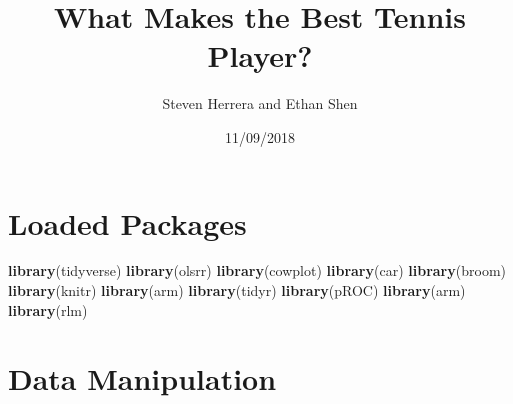 \documentclass[]{article}
\title{What Makes the Best Tennis Player?}
\author{Steven Herrera and Ethan Shen}
\date{11/09/2018}
\newenvironment{Shaded}{\begin{snugshade}}{\end{snugshade}}
\newcommand{\KeywordTok}[1]{\textcolor[rgb]{0.13,0.29,0.53}{\textbf{#1}}}
\newcommand{\NormalTok}[1]{#1}
\begin{document}
\maketitle

\hypertarget{loaded-packages}{%
\section{Loaded Packages}\label{loaded-packages}}

\begin{Shaded}
\begin{Highlighting}[]
\KeywordTok{library}\NormalTok{(tidyverse)}
\KeywordTok{library}\NormalTok{(olsrr)}
\KeywordTok{library}\NormalTok{(cowplot)}
\KeywordTok{library}\NormalTok{(car)}
\KeywordTok{library}\NormalTok{(broom)}
\KeywordTok{library}\NormalTok{(knitr)}
\KeywordTok{library}\NormalTok{(arm)}
\KeywordTok{library}\NormalTok{(tidyr)}
\KeywordTok{library}\NormalTok{(pROC)}
\KeywordTok{library}\NormalTok{(arm)}
\KeywordTok{library}\NormalTok{(rlm)}
\end{Highlighting}
\end{Shaded}

\hypertarget{data-manipulation}{%
\section{Data Manipulation}\label{data-manipulation}}
\end{document}
